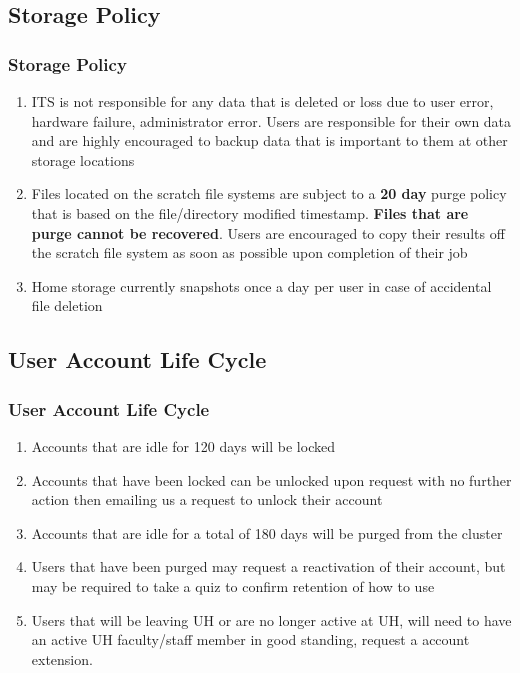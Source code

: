 \subsection{Storage Policy}
\begin{frame}
\frametitle{Storage Policy}
\begin{enumerate}
\item ITS is not responsible for any data that is deleted or loss due to user error, hardware failure, administrator error.  Users are responsible for their own data and are highly encouraged to backup data that is important to them at other storage locations
\item Files located on the scratch file systems are subject to a \textbf{20 day} purge policy that is based on the file/directory modified timestamp.  \textbf{Files that are purge cannot be recovered}.  Users are encouraged to copy their results off the scratch file system as soon as possible upon completion of their job
\item  Home storage currently snapshots once a day per user in case of accidental file deletion
\end{enumerate}
\end{frame}


\subsection{User Account Life Cycle}
\begin{frame}
\frametitle{User Account Life Cycle}
\begin{enumerate}
\item Accounts that are idle for 120 days will be locked
\item Accounts that have been locked can be unlocked upon request with no further action then emailing us a request to unlock their account
\item Accounts that are idle for a total of 180 days will be purged from the cluster
\item Users that have been purged may request a reactivation of their account, but may be required to take a quiz to confirm retention of how to use {\mana}
\item Users that will be leaving UH or are no longer active at UH, will need to have an active UH faculty/staff member in good standing, request a {\mana} account extension.
\end{enumerate}
\end{frame}


